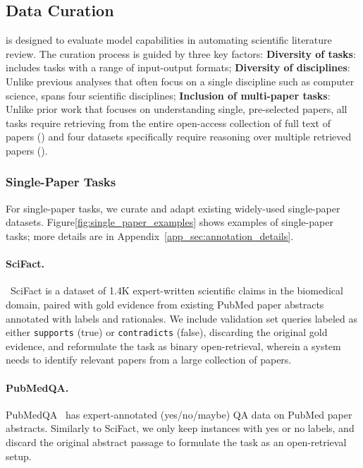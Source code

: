 \subsection{Data Curation}
\label{subsec:data_curation}
\data is designed to evaluate model capabilities in automating scientific literature review. The curation process is guided by three key factors: 
{\bf Diversity of tasks}: \data includes tasks with a range of input-output formats; 
{\bf Diversity of disciplines}: Unlike previous analyses that often focus on a single discipline such as computer science, 
\data spans four scientific disciplines; 
{\bf Inclusion of multi-paper tasks}: Unlike prior work that focuses on understanding single, pre-selected papers, all tasks require retrieving from the entire open-access collection of full text of papers () 
 and four datasets specifically require reasoning over multiple retrieved papers (). 


\subsubsection{Single-Paper Tasks}
\label{subsec:single_paper_task}
For single-paper tasks, we curate and adapt existing widely-used single-paper datasets. Figure\ref{fig:single_paper_examples} shows examples of single-paper tasks; more details are in Appendix~\ref{app_sec:annotation_details}. 

\paragraph{SciFact.}~SciFact \citep{wadden-etal-2020-fact} is a dataset of 1.4K expert-written scientific claims in the biomedical domain, paired with gold evidence from existing PubMed paper abstracts annotated with labels and rationales. 
We include validation set queries labeled as either \texttt{supports} (true) or \texttt{contradicts} (false), discarding the original gold evidence, and reformulate the task as binary open-retrieval, wherein a system needs to identify relevant papers from a large collection of papers.  

\paragraph{PubMedQA.}
{PubMedQA}~\citep{jin-etal-2019-pubmedqa} has expert-annotated (yes/no/maybe) QA data on PubMed paper abstracts. 
Similarly to {SciFact}, we only keep instances with yes or no labels, and discard the original abstract passage to formulate the task as an open-retrieval setup. 

